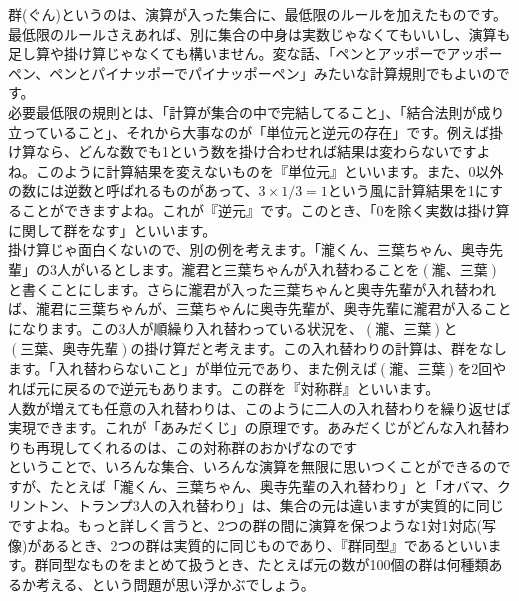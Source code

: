 群(ぐん)というのは、演算が入った集合に、最低限のルールを加えたものです。\\
最低限のルールさえあれば、別に集合の中身は実数じゃなくてもいいし、演算も足し算や掛け算じゃなくても構いません。変な話、「ペンとアッポーでアッポーペン、ペンとパイナッポーでパイナッポーペン」みたいな計算規則でもよいのです。\\
必要最低限の規則とは、「計算が集合の中で完結してること」、「結合法則が成り立っていること」、それから大事なのが「単位元と逆元の存在」です。例えば掛け算なら、どんな数でも1という数を掛け合わせれば結果は変わらないですよね。このように計算結果を変えないものを『単位元』といいます。また、0以外の数には逆数と呼ばれるものがあって、$3 × 1/3 = 1$という風に計算結果を1にすることができますよね。これが『逆元』です。このとき、「0を除く実数は掛け算に関して群をなす」といいます。\\
掛け算じゃ面白くないので、別の例を考えます。「瀧くん、三葉ちゃん、奥寺先輩」の3人がいるとします。瀧君と三葉ちゃんが入れ替わることを$(瀧、三葉)$と書くことにします。さらに瀧君が入った三葉ちゃんと奥寺先輩が入れ替われば、瀧君に三葉ちゃんが、三葉ちゃんに奥寺先輩が、奥寺先輩に瀧君が入ることになります。この3人が順繰り入れ替わっている状況を、$(瀧、三葉)$と$(三葉、奥寺先輩)$の掛け算だと考えます。この入れ替わりの計算は、群をなします。「入れ替わらないこと」が単位元であり、また例えば$(瀧、三葉)$を2回やれば元に戻るので逆元もあります。この群を『対称群』といいます。\\
人数が増えても任意の入れ替わりは、このように二人の入れ替わりを繰り返せば実現できます。これが「あみだくじ」の原理です。あみだくじがどんな入れ替わりも再現してくれるのは、この対称群のおかげなのです\\
ということで、いろんな集合、いろんな演算を無限に思いつくことができるのですが、たとえば「瀧くん、三葉ちゃん、奥寺先輩の入れ替わり」と「オバマ、クリントン、トランプ3人の入れ替わり」は、集合の元は違いますが実質的に同じですよね。もっと詳しく言うと、2つの群の間に演算を保つような1対1対応(写像)があるとき、2つの群は実質的に同じものであり、『群同型』であるといいます。群同型なものをまとめて扱うとき、たとえば元の数が100個の群は何種類あるか考える、という問題が思い浮かぶでしょう。

